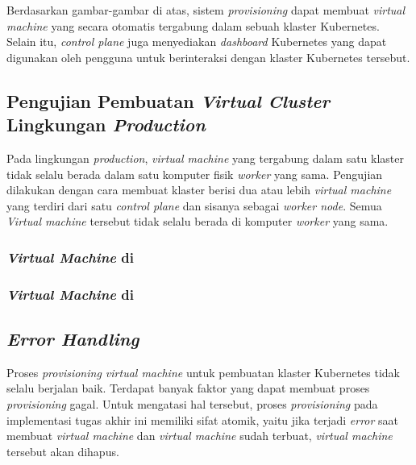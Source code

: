 Berdasarkan gambar-gambar di atas, sistem \emph{provisioning} dapat membuat
\emph{virtual machine} yang secara otomatis tergabung dalam sebuah klaster Kubernetes.
Selain itu, \emph{control plane} juga menyediakan \emph{dashboard} Kubernetes yang dapat
digunakan oleh pengguna untuk berinteraksi dengan klaster Kubernetes tersebut.

\subsection{Pengujian Pembuatan \emph{Virtual Cluster} Lingkungan \emph{Production}}
\label{subsec:pengujian-pembuatan-vc-prod}

Pada lingkungan \emph{production}, \emph{virtual machine} yang tergabung dalam
satu klaster tidak selalu berada dalam satu komputer fisik \emph{worker} yang sama.
Pengujian dilakukan dengan cara membuat klaster berisi dua atau lebih \emph{virtual machine}
yang terdiri dari satu \emph{control plane} dan sisanya sebagai \emph{worker node}.
Semua \emph{Virtual machine} tersebut tidak selalu berada di komputer \emph{worker}
yang sama.

\subsubsection{\emph{Virtual Machine} di }

\subsubsection{\emph{Virtual Machine} di }

\subsection{\emph{Error Handling}}
\label{subsec:error-handling}

Proses \emph{provisioning virtual machine} untuk pembuatan
klaster Kubernetes tidak selalu berjalan baik. Terdapat banyak
faktor yang dapat membuat proses \emph{provisioning} gagal. Untuk
mengatasi hal tersebut, proses \emph{provisioning} pada implementasi
tugas akhir ini memiliki sifat atomik, yaitu jika terjadi \emph{error}
saat membuat \emph{virtual machine} dan \emph{virtual machine} sudah terbuat,
\emph{virtual machine} tersebut akan dihapus.



